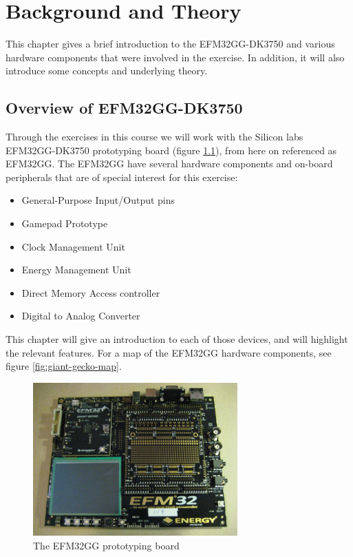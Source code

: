 \chapter{Background and Theory}

This chapter gives a brief introduction to the EFM32GG-DK3750 and various hardware components that were involved in the exercise. In addition, it will also introduce some concepts and underlying theory.

\section{Overview of EFM32GG-DK3750}
Through the exercises in this course we will work with the Silicon labs EFM32GG-DK3750 prototyping board (figure \ref{fig:efm-board}), from here on referenced as EFM32GG. The EFM32GG have several hardware components and on-board peripherals that are of special interest for this exercise:
\begin{itemize}
	\item General-Purpose Input/Output pins
	\item Gamepad Prototype
	\item Clock Management Unit
	\item Energy Management Unit
	\item Direct Memory Access controller
	\item Digital to Analog Converter
\end{itemize}
This chapter will give an introduction to each of those devices, and will highlight the relevant features. For a map of the EFM32GG hardware components, see figure \ref{fig:giant-gecko-map}.

\begin{figure}[ht]
  \centering
  \includegraphics[width=0.7\textwidth]{images/efm_board.jpg}
  \caption{The EFM32GG prototyping board}\label{fig:efm-board}
\end{figure}

